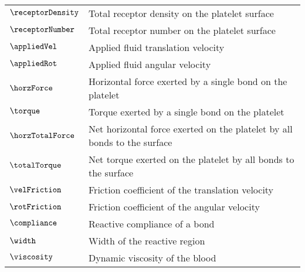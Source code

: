 \begin{tabular}{ll}
  $\receptorDensity$ & Total receptor density on the platelet surface \\
  $\receptorNumber$ & Total receptor number on the platelet surface \\
  $\appliedVel$ & Applied fluid translation velocity \\
  $\appliedRot$ & Applied fluid angular velocity \\
  $\horzForce$ & Horizontal force exerted by a single bond on the
                 platelet \\
  $\torque$ & Torque exerted by a single bond on the platelet \\
  $\horzTotalForce$ & Net horizontal force exerted on the platelet by
                      all bonds to the surface \\
  $\totalTorque$ & Net torque exerted on the platelet by all bonds to
                   the surface \\
  $\velFriction$ & Friction coefficient of the translation velocity \\
  $\rotFriction$ & Friction coefficient of the angular velocity \\
  $\compliance$ & Reactive compliance of a bond \\
  $\width$ & Width of the reactive region \\
  $\viscosity$ & Dynamic viscosity of the blood \\
  \bottomrule
\end{tabular}
